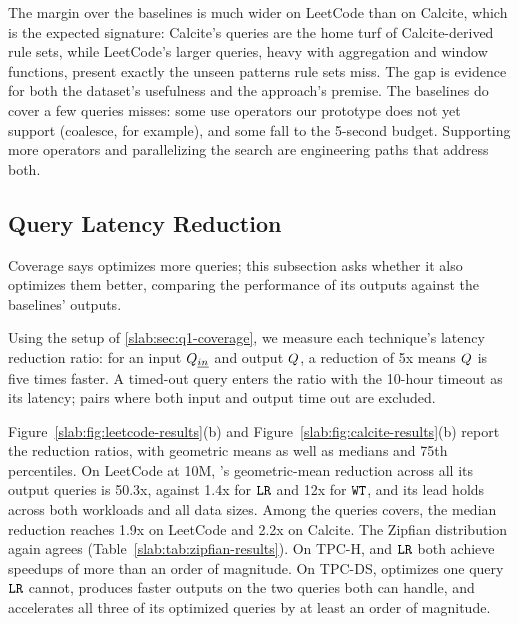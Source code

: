 The margin over the baselines is much wider on LeetCode than on
Calcite, which is the expected signature: Calcite's queries are the
home turf of Calcite-derived rule sets, while LeetCode's larger
queries, heavy with aggregation and window functions, present exactly
the unseen patterns rule sets miss. The gap is evidence for both the
dataset's usefulness and the approach's premise. The baselines do
cover a few queries \toolname misses: some use operators our
prototype does not yet support (coalesce, for example), and some fall
to the 5-second budget. Supporting more operators and parallelizing
the search are engineering paths that address both.

\subsection{Query Latency Reduction}
\label{slab:sec:q2-reduction}

Coverage says \toolname optimizes more queries; this subsection asks
whether it also optimizes them better, comparing the performance of
its outputs against the baselines' outputs.

Using the setup of \cref{slab:sec:q1-coverage}, we measure each
technique's latency reduction ratio: for an input $Q_{\emph{in}}$ and
output $Q$, a reduction of 5x means $Q$ is five times
faster. A timed-out query enters the ratio with the 10-hour timeout as
its latency; pairs where both input and output time out are excluded.





Figure~\ref{slab:fig:leetcode-results}(b) and
Figure~\ref{slab:fig:calcite-results}(b) report the reduction ratios,
with geometric means as well as medians and 75th percentiles. On
LeetCode at 10M, \toolname's geometric-mean reduction across all its output
queries is 50.3x, against 1.4x for $\texttt{LR}$ and 12x for $\texttt{WT}$, and its
lead holds across both workloads and all data sizes. Among the queries
\toolname covers, the median reduction reaches 1.9x on LeetCode and
2.2x on Calcite. The Zipfian distribution again agrees
(Table~\ref{slab:tab:zipfian-results}). On TPC-H, \toolname and
$\texttt{LR}$ both achieve speedups of more than an order of magnitude. On
TPC-DS, \toolname optimizes one query $\texttt{LR}$ cannot, produces faster
outputs on the two queries both can handle, and accelerates all three
of its optimized queries by at least an order of magnitude.


